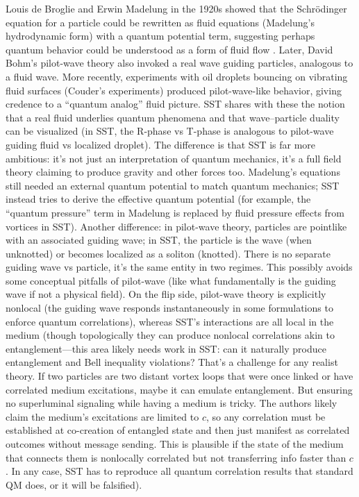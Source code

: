 \documentclass[10pt,reprint,aps,onecolumn,nofootinbib]{revtex4-2}
\begin{document}
Louis de Broglie and Erwin Madelung in the 1920s showed that the Schrödinger equation for a particle could be rewritten as fluid equations (Madelung’s hydrodynamic form) with a quantum potential term, suggesting perhaps quantum behavior could be understood as a form of fluid flow \cite{Madelung1926}. Later, David Bohm’s pilot-wave theory also invoked a real wave guiding particles, analogous to a fluid wave. More recently, experiments with oil droplets bouncing on vibrating fluid surfaces (Couder’s experiments) produced pilot-wave-like behavior, giving credence to a “quantum analog” fluid picture. SST shares with these the notion that a real fluid underlies quantum phenomena and that wave–particle duality can be visualized (in SST, the R-phase vs T-phase is analogous to pilot-wave guiding fluid vs localized droplet). The difference is that SST is far more ambitious: it’s not just an interpretation of quantum mechanics, it’s a full field theory claiming to produce gravity and other forces too. Madelung’s equations still needed an external quantum potential to match quantum mechanics; SST instead tries to derive the effective quantum potential (for example, the “quantum pressure” term in Madelung is replaced by fluid pressure effects from vortices in SST). Another difference: in pilot-wave theory, particles are pointlike with an associated guiding wave; in SST, the particle is the wave (when unknotted) or becomes localized as a soliton (knotted). There is no separate guiding wave vs particle, it’s the same entity in two regimes. This possibly avoids some conceptual pitfalls of pilot-wave (like what fundamentally is the guiding wave if not a physical field). On the flip side, pilot-wave theory is explicitly nonlocal (the guiding wave responds instantaneously in some formulations to enforce quantum correlations), whereas SST’s interactions are all local in the medium (though topologically they can produce nonlocal correlations akin to entanglement—this area likely needs work in SST: can it naturally produce entanglement and Bell inequality violations? That’s a challenge for any realist theory. If two particles are two distant vortex loops that were once linked or have correlated medium excitations, maybe it can emulate entanglement. But ensuring no superluminal signaling while having a medium is tricky. The authors likely claim the medium’s excitations are limited to $c$, so any correlation must be established at co-creation of entangled state and then just manifest as correlated outcomes without message sending. This is plausible if the state of the medium that connects them is nonlocally correlated but not transferring info faster than $c$. In any case, SST has to reproduce all quantum correlation results that standard QM does, or it will be falsified).
\end{document}
